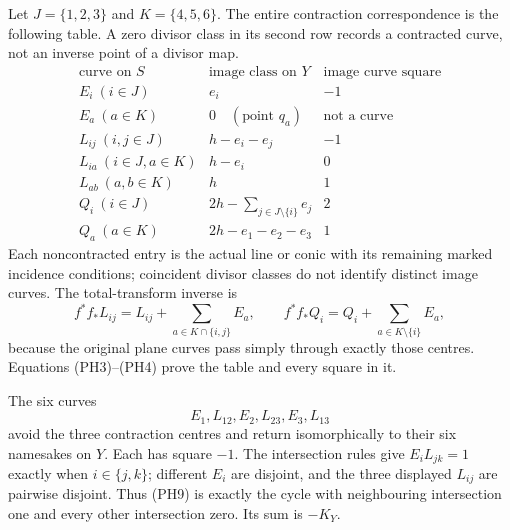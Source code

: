 Let $J=\{1,2,3\}$ and $K=\{4,5,6\}$. The entire contraction correspondence
is the following table. A zero divisor class in its second row records a
contracted curve, not an inverse point of a divisor map.
\[
\begin{array}{c|c|c}
\text{curve on }S&\text{image class on }Y&\text{image curve square}\\\hline
E_i\ (i\in J)&e_i&-1\\
E_a\ (a\in K)&0\quad(\text{point }q_a)&\text{not a curve}\\
L_{ij}\ (i,j\in J)&h-e_i-e_j&-1\\
L_{ia}\ (i\in J,a\in K)&h-e_i&0\\
L_{ab}\ (a,b\in K)&h&1\\
Q_i\ (i\in J)&2h-\sum_{j\in J\setminus\{i\}}e_j&2\\
Q_a\ (a\in K)&2h-e_1-e_2-e_3&1
\end{array}                                                     \tag{PH7}
\]
Each noncontracted entry is the actual line or conic with its remaining
marked incidence conditions; coincident divisor classes do not identify
distinct image curves. The total-transform inverse is
\[
 f^*f_*L_{ij}=L_{ij}+\sum_{a\in K\cap\{i,j\}}E_a,
 \qquad f^*f_*Q_i=Q_i+\sum_{a\in K\setminus\{i\}}E_a,           \tag{PH8}
\]
because the original plane curves pass simply through exactly those centres.
Equations (PH3)--(PH4) prove the table and every square in it.

The six curves
\[
 E_1,L_{12},E_2,L_{23},E_3,L_{13}                                \tag{PH9}
\]
avoid the three contraction centres and return isomorphically to their six
namesakes on $Y$. Each has square $-1$. The intersection rules give
$E_iL_{jk}=1$ exactly when $i\in\{j,k\}$; different $E_i$ are disjoint,
and the three displayed $L_{ij}$ are pairwise disjoint. Thus (PH9) is
exactly the cycle with neighbouring intersection one and every other
intersection zero. Its sum is $-K_Y$.

